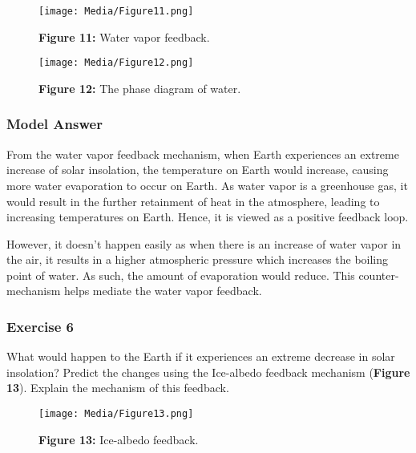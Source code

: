 \documentclass[
  letterpaper,
  DIV=11,
  numbers=noendperiod]{scrartcl}
\begin{document}
\begin{figure}

{\centering \texttt{[image: Media/Figure11.png]}

}

\caption{\textbf{Figure 11:} Water vapor feedback.}

\end{figure}

\begin{figure}

{\centering \texttt{[image: Media/Figure12.png]}

}

\caption{\textbf{Figure 12:} The phase diagram of water.}

\end{figure}

\subsubsection{\texorpdfstring{\textbf{Model Answer}}{Model Answer}}

From the water vapor feedback mechanism, when Earth experiences an
extreme increase of solar insolation, the temperature on Earth would
increase, causing more water evaporation to occur on Earth. As water
vapor is a greenhouse gas, it would result in the further retainment of
heat in the atmosphere, leading to increasing temperatures on Earth.
Hence, it is viewed as a positive feedback loop.

However, it doesn't happen easily as when there is an increase of water
vapor in the air, it results in a higher atmospheric pressure which
increases the boiling point of water. As such, the amount of evaporation
would reduce. This counter-mechanism helps mediate the water vapor
feedback.

\subsubsection{\texorpdfstring{\textbf{Exercise 6}}{Exercise 6}}

What would happen to the Earth if it experiences an extreme decrease in
solar insolation? Predict the changes using the Ice-albedo feedback
mechanism (\textbf{Figure 13}). Explain the mechanism of this feedback.

\begin{figure}

{\centering \texttt{[image: Media/Figure13.png]}

}

\caption{\textbf{Figure 13:} Ice-albedo feedback.}

\end{figure}
\end{document}
